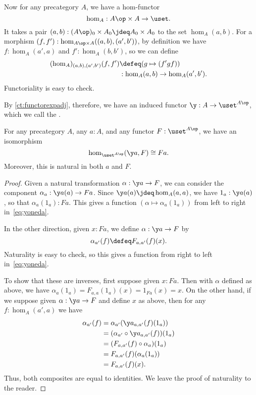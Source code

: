 Now for any precategory $A$, we have a hom-functor
%
\[\hom_A : A\op \times A \to \uset.\]
It takes a pair $(a,b): (A\op)_0 \times A_0 \jdeq A_0 \times A_0$ to the set $\hom_A(a,b)$.
For a morphism $(f,f') : \hom_{A\op\times A}((a,b),(a',b'))$, by definition we have $f:\hom_A(a',a)$ and $f':\hom_A(b,b')$, so we can define
\begin{align*}
  (\hom_A)_{(a,b),(a',b')}(f,f')
  &\defeq (g \mapsto (f'gf))\\
  &: \hom_A(a,b) \to \hom_A(a',b').
\end{align*}
Functoriality is easy to check.

By \cref{ct:functorexpadj}, therefore, we have an induced functor $\y:A\to \uset^{A\op}$, which we call the .
%
%

\begin{thm}\label{ct:yoneda}
  For any precategory $A$, any $a:A$, and any functor $F:\uset^{A\op}$, we have an isomorphism
  \begin{equation}\label{eq:yoneda}
    \hom_{\uset^{A\op}}(\y a, F) \cong Fa.
  \end{equation}
  Moreover, this is natural in both $a$ and $F$.
\end{thm}
\begin{proof}
  Given a natural transformation $\alpha:\y a \to F$, we can consider the component $\alpha_a : \y a(a) \to F a$.
  Since $\y a(a)\jdeq \hom_A(a,a)$, we have $1_a : \y a(a)$, so that $\alpha_a(1_a) : F a$.
  This gives a function $(\alpha \mapsto \alpha_a(1_a))$ from left to right in~\eqref{eq:yoneda}.

  In the other direction, given $x:F a$, we define $\alpha:\y a \to F$ by
  \[\alpha_{a'}(f) \defeq F_{a,a'}(f)(x). \]
  Naturality is easy to check, so this gives a function from right to left in~\eqref{eq:yoneda}.

  To show that these are inverses, first suppose given $x:F a$.
  Then with $\alpha$ defined as above, we have $\alpha_a(1_a) = F_{a,a}(1_a)(x) = 1_{F a}(x) = x$.
  On the other hand, if we suppose given $\alpha:\y a \to F$ and define $x$ as above, then for any $f:\hom_A(a',a)$ we have
  \begin{align*}
    \alpha_{a'}(f)
    &= \alpha_{a'} (\y a_{a,a'}(f)(1_a))\\
    &= (\alpha_{a'}\circ \y a_{a,a'}(f))(1_a)\\
    &= (F_{a,a'}(f)\circ \alpha_a)(1_a)\\
    &= F_{a,a'}(f)(\alpha_a(1_a))\\
    &= F_{a,a'}(f)(x).
  \end{align*}
  Thus, both composites are equal to identities.
  We leave the proof of naturality to the reader.
\end{proof}

